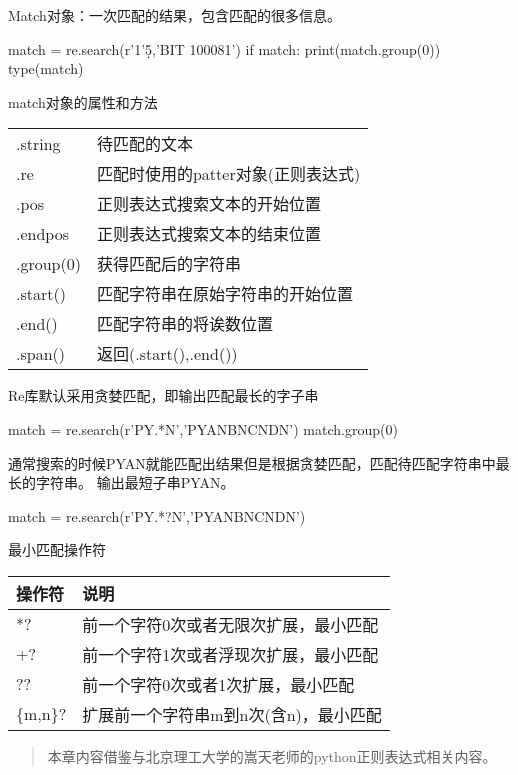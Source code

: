 Match对象：一次匹配的结果，包含匹配的很多信息。
\begin{python}
match = re.search(r'1'\d{5},'BIT 100081')
if match:
    print(match.group(0))
type(match)
\end{python}
match对象的属性和方法
\begin{center}
\begin{tabular}{|l|l|}
.string&待匹配的文本\\
.re&匹配时使用的patter对象(正则表达式)\\
.pos&正则表达式搜索文本的开始位置\\
.endpos&正则表达式搜索文本的结束位置\\
.group(0)&获得匹配后的字符串\\
.start()&匹配字符串在原始字符串的开始位置\\
.end()&匹配字符串的将诶数位置\\
.span()&返回(.start(),.end())\\
\end{tabular}
\end{center}
Re库默认采用贪婪匹配，即输出匹配最长的字子串
\begin{python}
match = re.search(r'PY.*N','PYANBNCNDN')
match.group(0)
\end{python}
通常搜索的时候PYAN就能匹配出结果但是根据贪婪匹配，匹配待匹配字符串中最长的字符串。
输出最短子串PYAN。
\begin{python}
match = re.search(r'PY.*?N','PYANBNCNDN')
\end{python}
最小匹配操作符
\begin{tabular}{|l|l|}
\hline
操作符&说明\\
\hline
*?&前一个字符0次或者无限次扩展，最小匹配\\
\hline
+?&前一个字符1次或者浮现次扩展，最小匹配\\
\hline
??&前一个字符0次或者1次扩展，最小匹配\\
\hline
\{m,n\}?&扩展前一个字符串m到n次(含n)，最小匹配\\
\hline
\end{tabular}
\begin{quote}
本章内容借鉴与北京理工大学的嵩天老师的python正则表达式相关内容。
\end{quote}
